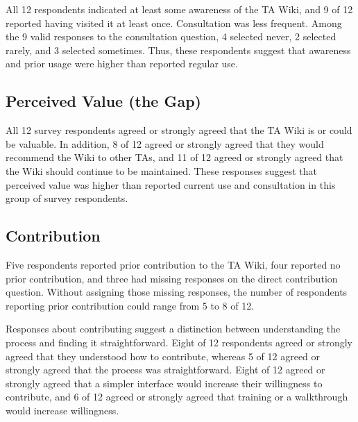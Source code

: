 \documentclass[11pt]{article}
\newcommand{\td}[1]{\item \textcolor{red!70!black}{TODO: #1}}
\begin{document}
All 12 respondents indicated at least some awareness of the TA Wiki, and 9 of 12 reported having visited it at least once. Consultation was less frequent. Among the 9 valid responses to the consultation question, 4 selected never, 2 selected rarely, and 3 selected sometimes. Thus, these respondents suggest that awareness and prior usage were higher than reported regular use.
\subsection{Perceived Value (the Gap)}
All 12 survey respondents agreed or strongly agreed that the TA Wiki is or could be valuable. In addition, 8 of 12 agreed or strongly agreed that they would recommend the Wiki to other TAs, and 11 of 12 agreed or strongly agreed that the Wiki should continue to be maintained. These responses suggest that perceived value was higher than reported current use and consultation in this group of survey respondents.

\subsection{Contribution}
Five respondents reported prior contribution to the TA Wiki, four reported no prior contribution, and three had missing responses on the direct contribution question. Without assigning those missing responses, the number of respondents reporting prior contribution could range from 5 to 8 of 12.

Responses about contributing suggest a distinction between understanding the process and finding it straightforward.  Eight of 12 respondents agreed or strongly agreed that they understood how to contribute, whereas 5 of 12 agreed or strongly agreed that the process was straightforward. Eight of 12 agreed or strongly agreed that a simpler interface would increase their willingness to contribute, and 6 of 12 agreed or strongly agreed that training or a walkthrough would increase willingness.
\end{document}

